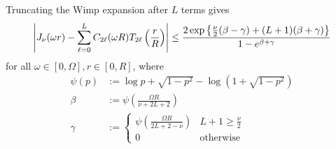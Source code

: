 \begin{lemma} \label{lem:wimp} Truncating the Wimp expansion after $L$ terms
    gives
    \begin{equation}
        \left|J_\nu(\omega r) - \sum_{\ell=0}^L C_{2\ell}(\omega R) T_{2\ell}\left( \frac{r}{R} \right)\right| 
        \leq \frac{2\exp\left\{ \frac{\nu}{2}(\beta - \gamma) + (L+1)(\beta + \gamma) \right\}}{1 - e^{\beta + \gamma}}
    \end{equation}
    for all $\omega \in [0, \Omega], r \in [0, R]$, where
    \begin{align}
        \psi(p) &:= \log p + \sqrt{1 - p^2} - \log\left( 1 + \sqrt{1 - p^2} \right) \\
        \beta &:= \psi\left( \frac{\Omega R}{\nu + 2L + 2} \right) \\
        \gamma &:= \begin{cases}
            \psi\left( \frac{\Omega R}{2L + 2 - \nu} \right) & L + 1 \geq \frac{\nu}{2} \\
            0 & \text{otherwise}
        \end{cases}
    \end{align}
\end{lemma}
